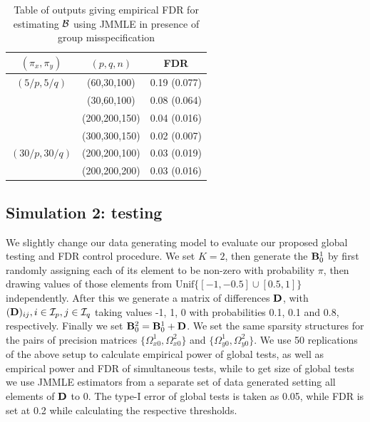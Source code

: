 \begin{scriptsize}
\begin{table}[t]
\centering
    \begin{tabular}{ccc}
    \hline
    $(\pi_x, \pi_y)$ & $(p,q,n)$   & FDR          \\\hline
    $(5/p, 5/q)$   & (60,30,100)   & 0.19 (0.077) \\
    ~              & (30,60,100)   & 0.08 (0.064) \\
    ~              & (200,200,150) & 0.04 (0.016) \\
    ~              & (300,300,150) & 0.02 (0.007) \\\hline
    $(30/p, 30/q)$ & (200,200,100) & 0.03 (0.019) \\
    ~              & (200,200,200) & 0.03 (0.016) \\\hline
    \end{tabular}
    \caption{Table of outputs giving empirical FDR for estimating ${\cal{B}}$ using JMMLE in presence of group misspecification}
    \label{table:simtable22}
\end{table}
\end{scriptsize}

\subsection{Simulation 2: testing}
\label{sec:eval-testing}
We slightly change our data generating model to evaluate our proposed global testing and FDR control procedure. We set $K=2$, then generate the ${\mathbf{B}}_0^1$ by first randomly assigning each of its element to be non-zero with probability $\pi$, then drawing values of those elements from $\text{Unif}\{ [ -1, -0.5] \cup [0.5,1]\}$ independently. After this we generate a matrix of differences ${\mathbf{D}}$, with $({\mathbf{D}})_{ij}, i \in {\cal{I}}_p, j \in {\cal{I}}_q$ taking values -1, 1, 0 with probabilities 0.1, 0.1 and 0.8, respectively. Finally we set ${\mathbf{B}}_0^2 = {\mathbf{B}}_0^1 + {\mathbf{D}}$. We set the same sparsity structures for the pairs of precision matrices $\{ \Omega_{x0}^1, \Omega_{x0}^2 \}$ and $\{ \Omega_{y0}^1, \Omega_{y0}^2 \}$. We use 50 replications of the above setup to calculate empirical power of global tests, as well as empirical power and FDR of simultaneous tests, while to get size of global tests we use JMMLE estimators from a separate set of data generated setting all elements of ${\mathbf{D}}$ to 0. The type-I error of global tests is taken as 0.05, while FDR is set at 0.2 while calculating the respective thresholds.

